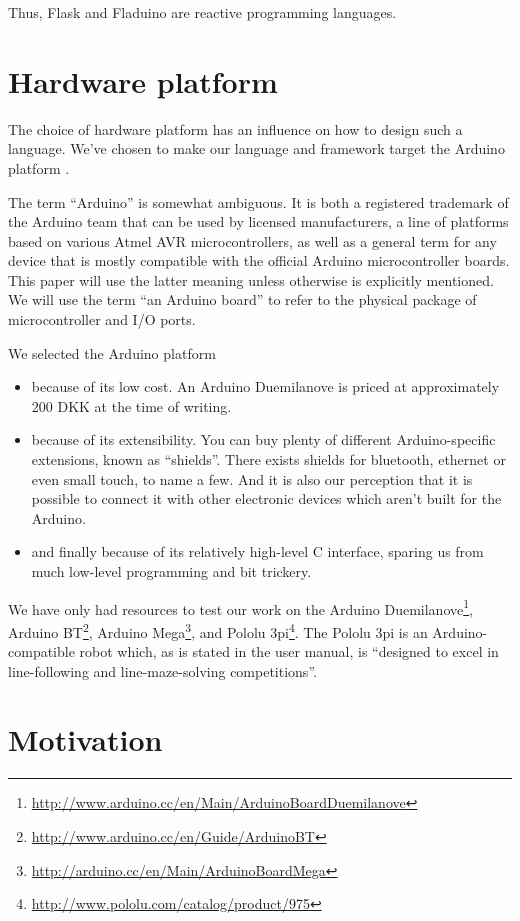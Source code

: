 \documentclass[a4paper, oneside, final]{memoir}
\begin{document}
Thus, Flask and Fladuino are reactive programming languages.


\section{Hardware platform}
\label{sec:hardware platform}
The choice of hardware platform has an influence on how to design such
a language. We've chosen to make our language and framework target the
Arduino platform \cite{arduino}.

The term ``Arduino'' is somewhat ambiguous.  It is both a registered
trademark of the Arduino team that can be used by licensed
manufacturers, a line of platforms based on various Atmel AVR
microcontrollers, as well as a general term for any device that is
mostly compatible with the official Arduino microcontroller boards.
This paper will use the latter meaning unless otherwise is explicitly
mentioned.  We will use the term ``an Arduino board'' to refer to the
physical package of microcontroller and I/O ports.

\noindent
We selected the Arduino platform 
\begin{itemize}
\item because of its low cost. An Arduino Duemilanove is priced at
  approximately 200 \nolinebreak DKK at the time of writing.
\item because of its extensibility. You can buy plenty of different
  Arduino-specific extensions, known as ``shields''. There exists shields for
  bluetooth, ethernet or even small touch, to name a few. And it is also
  our perception that it is possible to connect it with other
  electronic devices which aren't built for the Arduino.
\item and finally because of its relatively high-level C interface,
  sparing us from much low-level programming and bit trickery.
\end{itemize}

We have only had resources to test our work on the Arduino
Duemilanove\footnote{\url{http://www.arduino.cc/en/Main/ArduinoBoardDuemilanove}},
Arduino BT\footnote{\url{http://www.arduino.cc/en/Guide/ArduinoBT}},
Arduino
Mega\footnote{\url{http://arduino.cc/en/Main/ArduinoBoardMega}}, and
Pololu 3pi\footnote{\url{http://www.pololu.com/catalog/product/975}}.
The Pololu 3pi is an Arduino-compatible robot which, as is stated in
the user manual, is ``designed to excel in line-following and
line-maze-solving competitions''.


\section{Motivation}
\label{sec:motivation}
\end{document}
